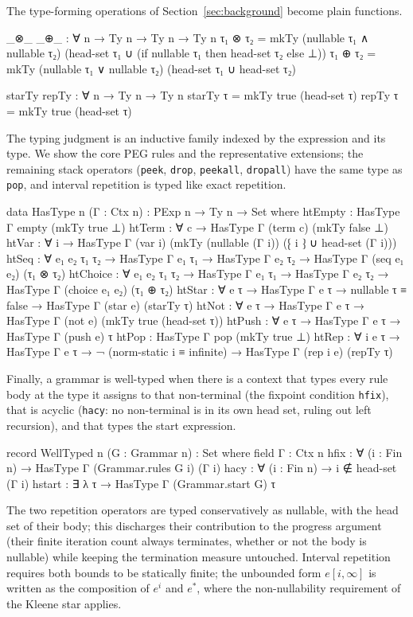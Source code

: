 \documentclass[preprint,12pt]{elsarticle}
\theoremstyle{definition}
\begin{document}
\clearpage 

The type-forming
operations of Section~\ref{sec:background} become plain functions.

\begin{code}
  _⊗_ _⊕_ : ∀ {n} → Ty n → Ty n → Ty n
  τ₁ ⊗ τ₂ = mkTy (nullable τ₁ ∧ nullable τ₂)
                     (head-set τ₁ ∪ (if nullable τ₁ then head-set τ₂ else ⊥))
  τ₁ ⊕ τ₂ = mkTy (nullable τ₁ ∨ nullable τ₂) (head-set τ₁ ∪ head-set τ₂)

  starTy repTy : ∀ {n} → Ty n → Ty n
  starTy τ = mkTy true (head-set τ)
  repTy τ = mkTy true (head-set τ)
\end{code}
The typing judgment is an inductive family indexed by the expression and its type.
We show the core PEG rules and the representative extensions; the remaining stack
operators (\lstinline{peek}, \lstinline{drop}, \lstinline{peekall},
\lstinline{dropall}) have the same type as \lstinline{pop}, and interval
repetition is typed like exact repetition.
\begin{code}
  data HasType {n} (Γ : Ctx n) : PExp n → Ty n → Set where
    htEmpty  : HasType Γ empty (mkTy true ⊥)
    htTerm   : ∀ {c} → HasType Γ (term c) (mkTy false ⊥)
    htVar    : ∀ {i} → HasType Γ (var i)
                         (mkTy (nullable (Γ i)) (⁅ i ⁆ ∪ head-set (Γ i)))
    htSeq    : ∀ {e₁ e₂ τ₁ τ₂} → HasType Γ e₁ τ₁ → HasType Γ e₂ τ₂
             → HasType Γ (seq e₁ e₂) (τ₁ ⊗ τ₂)
    htChoice : ∀ {e₁ e₂ τ₁ τ₂} → HasType Γ e₁ τ₁ → HasType Γ e₂ τ₂
             → HasType Γ (choice e₁ e₂) (τ₁ ⊕ τ₂)
    htStar   : ∀ {e τ} → HasType Γ e τ → nullable τ ≡ false
             → HasType Γ (star e) (starTy τ)
    htNot    : ∀ {e τ} → HasType Γ e τ → HasType Γ (not e) (mkTy true (head-set τ))
    htPush   : ∀ {e τ} → HasType Γ e τ → HasType Γ (push e) τ
    htPop    : HasType Γ pop (mkTy true ⊥)
    htRep    : ∀ {i e τ} → HasType Γ e τ → ¬ (norm-static i ≡ infinite)
             → HasType Γ (rep i e) (repTy τ)
\end{code}
Finally, a grammar is well-typed when there is a context that types every rule
body at the type it assigns to that non-terminal (the fixpoint condition
\lstinline{hfix}), that is acyclic (\lstinline{hacy}: no non-terminal is in its
own head set, ruling out left recursion), and that types the start expression.

\clearpage

\begin{code}
  record WellTyped {n} (G : Grammar n) : Set where
    field Γ      : Ctx n
          hfix   : ∀ (i : Fin n) → HasType Γ (Grammar.rules G i) (Γ i)
          hacy   : ∀ (i : Fin n) → i ∉ head-set (Γ i)
          hstart : ∃ λ τ → HasType Γ (Grammar.start G) τ
\end{code}
The two repetition operators are typed conservatively as nullable, with the head
set of their body; this discharges their contribution to the progress argument
(their finite iteration count always terminates, whether or not the body is
nullable) while keeping the termination measure untouched. Interval repetition
requires both bounds to be statically finite; the unbounded form $e[i,\infty]$ is
written as the composition of $e^{i}$ and $e^{*}$, where the non-nullability
requirement of the Kleene star applies.
\end{document}
